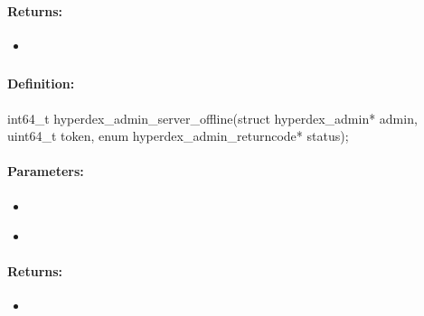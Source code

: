 \paragraph{Returns:}
\begin{itemize}[noitemsep]
\item {}\\

\end{itemize}

\pagebreak
\subsubsection{}
\label{api:c:server_offline}


\paragraph{Definition:}
\begin{ccode}
int64_t hyperdex_admin_server_offline(struct hyperdex_admin* admin,
        uint64_t token,
        enum hyperdex_admin_returncode* status);
\end{ccode}

\paragraph{Parameters:}
\begin{itemize}[noitemsep]
\item {}\\

\item {}\\

\end{itemize}

\paragraph{Returns:}
\begin{itemize}[noitemsep]
\item {}\\

\end{itemize}

